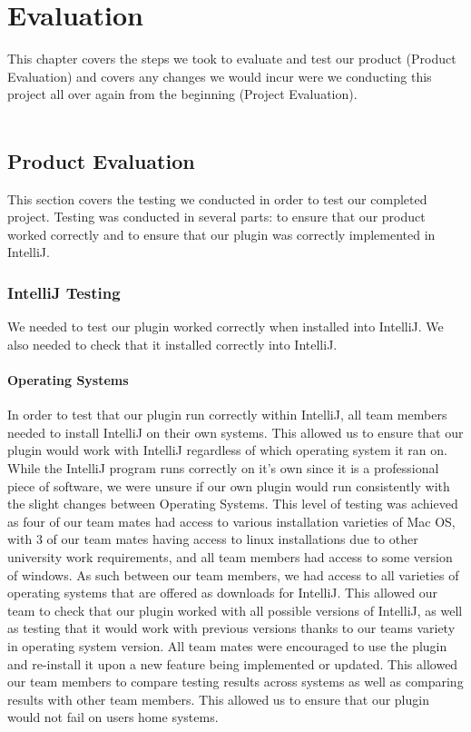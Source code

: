 \chapter{Evaluation}
\label{evaluation}

This chapter covers the steps we took to evaluate and test our product (Product Evaluation) and covers any changes we would incur were we conducting this project all over again from the beginning (Project Evaluation).\\
\\
\section{Product Evaluation}
This section covers the testing we conducted in order to test our completed project. Testing was conducted in several parts: to ensure that our product worked correctly and to ensure that our plugin was correctly implemented in IntelliJ.

\subsection{IntelliJ Testing}
We needed to test our plugin worked correctly when installed into IntelliJ. We also needed to check that it installed correctly into IntelliJ. \\

\subsubsection{Operating Systems}
In order to test that our plugin run correctly within IntelliJ, all team members needed to install IntelliJ on their own systems. This allowed us to ensure that our plugin would work with IntelliJ regardless of which operating system it ran on. While the IntelliJ program runs correctly on it's own since it is a professional piece of software, we were unsure if our own plugin would run consistently with the slight changes between Operating Systems. This level of testing was achieved as four of our team mates had access to various installation varieties of Mac OS, with 3 of our team mates having access to linux installations due to other university work requirements, and all team members had access to some version of windows. As such between our team members, we had access to all varieties of operating systems that are offered as downloads for IntelliJ. This allowed our team to check that our plugin worked with all possible versions of IntelliJ, as well as testing that it would work with previous versions thanks to our teams variety in operating system version. All team mates were encouraged to use the plugin and re-install it upon a new feature being implemented or updated. This allowed our team members to compare testing results across systems as well as comparing results with other team members. This allowed us to ensure that our plugin would not fail on users home systems.\\
\\
